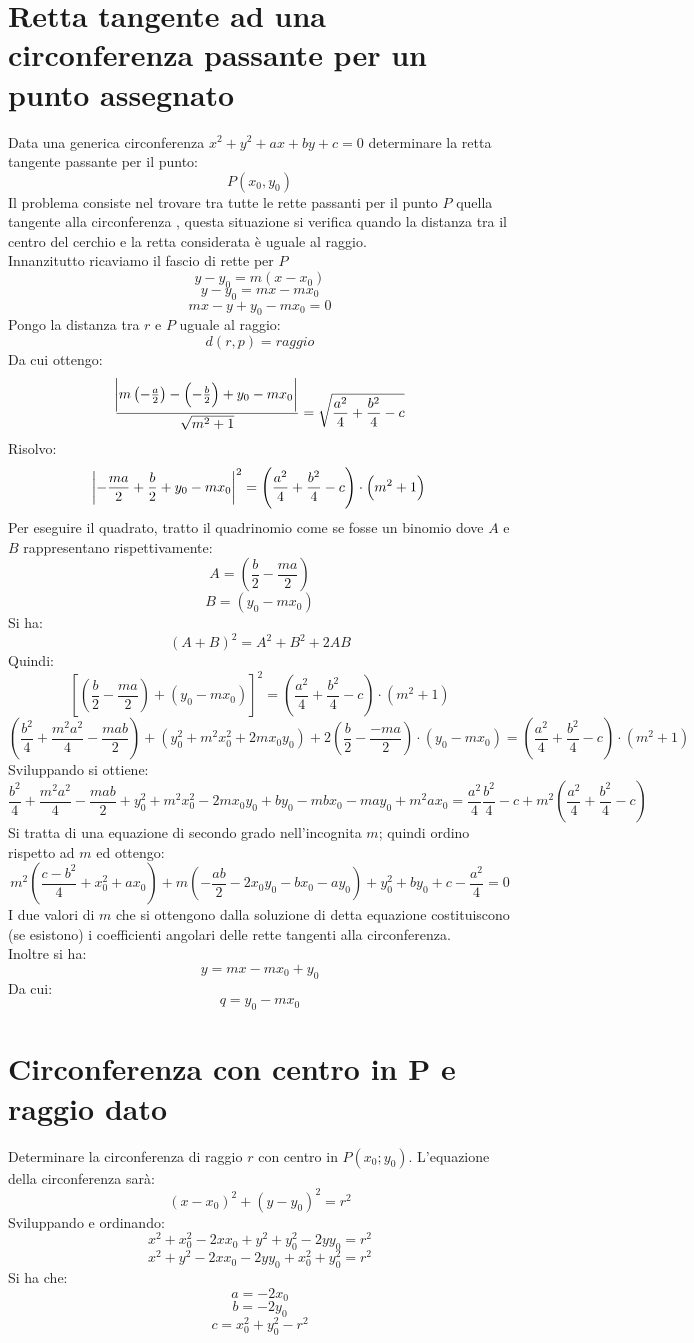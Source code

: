 \documentclass[12pt]{book}
\begin{document}
			\section{Retta tangente ad una circonferenza passante per un punto assegnato}
			Data una generica circonferenza $x^2+y^2+ax+by+c=0$ determinare la retta tangente passante per il punto:
			\[P(x_0,y_0)\]
			Il problema consiste nel trovare tra tutte le rette passanti per il punto $P$ quella tangente alla circonferenza , questa situazione si verifica quando la distanza tra il centro del cerchio e la retta considerata è uguale al raggio.
			\\Innanzitutto ricaviamo il fascio di rette per $P$
			\[y-y_0=m(x-x_0)\]
			\[y-y_0=mx-mx_0\]
			\[mx-y+y_0-mx_0=0\]
			Pongo la distanza tra $r$ e $P$ uguale al raggio:
			\[d(r,p)=raggio\]
			Da cui ottengo:
			\[\frac{\abs{m\left(-\frac{a}{2}\right)-\left(-\frac{b}{2}\right)+y_0-mx_0}}{\sqrt{m^2+1}}
			=\sqrt{\frac{a^2}{4}+\frac{b^2}{4}-c}\]
			Risolvo:
			\[\abs{-\frac{ma}{2}+\frac{b}{2}+y_0-mx_0}^2=
			\left(\frac{a^2}{4}+\frac{b^2}{4}-c\right)\cdot\left(m^2+1\right)\]
			Per eseguire il quadrato, tratto il quadrinomio come se fosse un binomio dove $A$ e $B$ rappresentano rispettivamente:
			\[A=\left(\frac{b}{2}-\frac{ma}{2}\right)\]
			\[B=\left(y_0-mx_0\right)\]
			Si ha:
			\[\left(A+B\right)^2=A^2+B^2+2AB\]
			Quindi:
			\[\left[\left(\frac{b}{2}-\frac{ma}{2}\right)+\left(y_0-mx_0\right)\right]^2=\left(\frac{a^2}{4}+\frac{b^2}{4}-c\right)\cdot\left(m^2+1\right)\]
			\[\left(\frac{b^2}{4}+\frac{m^2a^2}{4}-\frac{mab}{2}\right)+\left(y_0^2+m^2x_0^2+2mx_0y_0\right)+2\left(\frac{b}{2}-\frac{-ma}{2}\right)\cdot\left(y_0-mx_0\right)=\left(\frac{a^2}{4}+\frac{b^2}{4}-c\right)\cdot\left(m^2+1\right)\]
			Sviluppando si ottiene:
			\[\frac{b^2}{4}+\frac{m^2a^2}{4}-\frac{mab}{2}+y_0^2+m^2x_0^2-2mx_0y_0+by_0-mbx_0-may_0+m^2ax_0=\frac{a^2}{4}\frac{b^2}{4}-c+m^2\left(\frac{a^2}{4}+\frac{b^2}{4}-c\right)\]
			Si tratta di una equazione di secondo grado nell'incognita $m$; quindi ordino rispetto ad $m$ ed ottengo:
			\[m^2\left(\frac{c-b^2}{4}+x_0^2+ax_0\right)+m\left(-\frac{ab}{2}-2x_0y_0-bx_0-ay_0\right)+y_0^2+by_0+c-\frac{a^2}{4}=0\]
			I due valori di $m$ che si ottengono dalla soluzione di detta equazione costituiscono (se esistono) i coefficienti angolari delle rette tangenti alla circonferenza.
			\\Inoltre si ha:
			\[y=mx-mx_0+y_0\]
			Da cui:
			\[q=y_0-mx_0\]
			
		
			\section{Circonferenza con centro in P e raggio dato}
			Determinare la circonferenza di raggio $r$ con centro in $P(x_0;y_0)$.
			L'equazione della circonferenza sarà:
			\[\left(x-x_0\right)^2+\left(y-y_0\right)^2=r^2\]
			Sviluppando e ordinando:
			\[x^2+x_0^2-2xx_0+y^2+y_0^2-2yy_0=r^2\]
			\[x^2+y^2-2xx_0-2yy_0+x_0^2+y_0^2=r^2\]
			Si ha che:
			\[a=-2x_0\]
			\[b=-2y_0\]
			\[c=x_0^2+y_0^2-r^2\]
			
\end{document}

